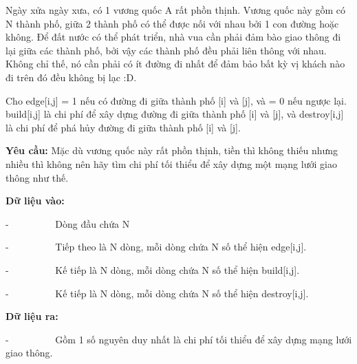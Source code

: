 

Ngày xửa ngày xưa, có 1 vương quốc A rất phồn thịnh. Vương quốc này gồm có N thành phố, giữa 2 thành phố có thể được nối với nhau bởi 1 con đường hoặc không. Để đất nước có thể phát triển, nhà vua cần phải đảm bào giao thông đi lại giữa các thành phố, bởi vậy các thành phố đều phải liên thông với nhau. Không chỉ thế, nó cần phải có ít đường đi nhất để đảm bảo bất kỳ vị khách nào đi trên đó đều không bị lạc :D.

Cho edge[i,j] = 1 nếu có đường đi giữa thành phố [i] và [j], và = 0 nếu ngược lại. build[i,j] là chi phí để xây dựng đường đi giữa thành phố [i] và [j], và destroy[i,j] là chi phí để phá hủy đường đi giữa thành phố [i] và [j].

\textbf{Yêu cầu: }Mặc dù vương quốc này rất phồn thịnh, tiền thì không thiếu nhưng nhiều thì không nên hãy tìm chi phí tối thiểu để xây dựng một mạng lưới giao thông như thế.

\textbf{Dữ liệu vào: }

-          Dòng đầu chứa N

-          Tiếp theo là N dòng, mỗi dòng chứa N số thể hiện edge[i,j].

-          Kế tiếp là N dòng, mỗi dòng chứa N số thể hiện build[i,j].

-          Kế tiếp là N dòng, mỗi dòng chứa N số thể hiện destroy[i,j].

\textbf{Dữ liệu ra:}

-          Gồm 1 số nguyên duy nhất là chi phí tối thiểu để xây dựng mạng lưới giao thông.

